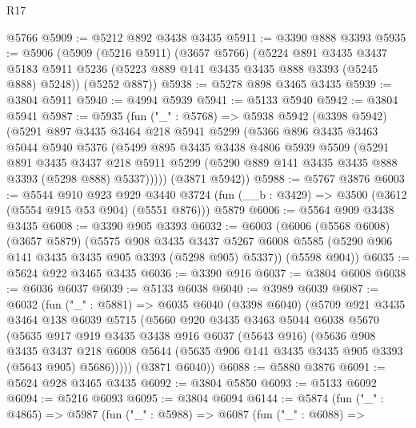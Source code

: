 \begin{lexlean}{R17}
\begin{coremodule}
    @5766
@5909 := @5212 @892 @3438 @3435
@5911 := @3390 @888 @3393
@5935 := @5906
    (@5909
      (@5216 @5911)
      (@3657 @5766)
      (@5224
        @891
        @3435
        @3437
        @5183
        @5911
        @5236
        (@5223 @889 @141 @3435 @3435 @888 @3393 (@5245 @888) @5248))
      (@5252 @887))
@5938 := @5278 @898 @3465 @3435
@5939 := @3804 @5911
@5940 := @4994 @5939
@5941 := @5133 @5940
@5942 := @3804 @5941
@5987 := @5935
    (fun ("_" : @5768) =>
    @5938
      @5942
      (@3398 @5942)
      (@5291
        @897
        @3435
        @3464
        @218
        @5941
        @5299
        (@5366
          @896
          @3435
          @3463
          @5044
          @5940
          @5376
          (@5499
            @895
            @3435
            @3438
            @4806
            @5939
            @5509
            (@5291
              @891
              @3435
              @3437
              @218
              @5911
              @5299
              (@5290 @889 @141 @3435 @3435 @888 @3393 (@5298 @888) @5337)))))
      (@3871 @5942))
@5988 := @5767 @3876
@6003 := @5544
    @910
    @923
    @929
    @3440
    @3724
    (fun (__b : @3429) => @3500 (@3612 (@5554 @915 @53 @904) (@5551 @876)))
    @5879
@6006 := @5564 @909 @3438 @3435
@6008 := @3390 @905 @3393
@6032 := @6003
    (@6006
      (@5568 @6008)
      (@3657 @5879)
      (@5575
        @908
        @3435
        @3437
        @5267
        @6008
        @5585
        (@5290 @906 @141 @3435 @3435 @905 @3393 (@5298 @905) @5337))
      (@5598 @904))
@6035 := @5624 @922 @3465 @3435
@6036 := @3390 @916
@6037 := @3804 @6008
@6038 := @6036 @6037
@6039 := @5133 @6038
@6040 := @3989 @6039
@6087 := @6032
    (fun ("_" : @5881) =>
    @6035
      @6040
      (@3398 @6040)
      (@5709
        @921
        @3435
        @3464
        @138
        @6039
        @5715
        (@5660
          @920
          @3435
          @3463
          @5044
          @6038
          @5670
          (@5635
            @917
            @919
            @3435
            @3438
            @916
            @6037
            (@5643 @916)
            (@5636
              @908
              @3435
              @3437
              @218
              @6008
              @5644
              (@5635 @906 @141 @3435 @3435 @905 @3393 (@5643 @905) @5686)))))
      (@3871 @6040))
@6088 := @5880 @3876
@6091 := @5624 @928 @3465 @3435
@6092 := @3804 @5850
@6093 := @5133 @6092
@6094 := @5216 @6093
@6095 := @3804 @6094
@6144 := @5874
    (fun ("_" : @4865) =>
    @5987
      (fun ("_" : @5988) =>
      @6087
        (fun ("_" : @6088) =>

\end{coremodule}
\end{lexlean}
